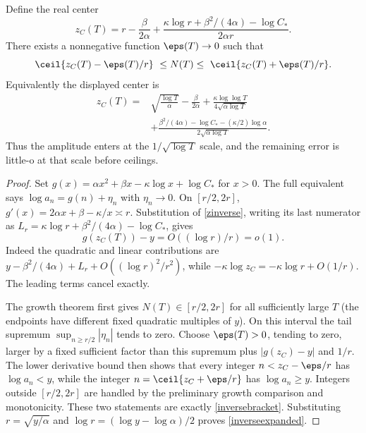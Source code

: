 \begin{corollary}\label{cor:inverse}
Define the real center
\begin{equation}\label{zinverse}
 z_C(T)=r-\frac{\beta}{2\alpha}
       +\frac{\kappa\log r+\beta^2/(4\alpha)-\log C_*}{2\alpha r}.
\end{equation}
There exists a nonnegative function $\eps(T)\to0$ such that
\begin{equation}\label{inversebracket}
 \ceil{z_C(T)-\eps(T)/r}\ \le N(T)\le\ \ceil{z_C(T)+\eps(T)/r}.
\end{equation}
Equivalently the displayed center is
\begin{align}\label{inverseexpanded}
 z_C(T)={}&\sqrt{\frac{\log T}{\alpha}}-\frac{\beta}{2\alpha}
 +\frac{\kappa\log\log T}{4\sqrt{\alpha\log T}}\nonumber\\
 &+\frac{\beta^2/(4\alpha)-\log C_*-(\kappa/2)\log\alpha}
             {2\sqrt{\alpha\log T}}.
\end{align}
Thus the amplitude enters at the $1/\sqrt{\log T}$ scale, and the
remaining error is little-o at that scale before ceilings.
\end{corollary}
\begin{proof}
Set $g(x)=\alpha x^2+\beta x-\kappa\log x+\log C_*$ for $x>0$.
The full equivalent says $\log a_n=g(n)+\eta_n$ with $\eta_n\to0$.
On $[r/2,2r]$, $g'(x)=2\alpha x+\beta-\kappa/x\asymp r$.
Substitution of \eqref{zinverse}, writing its last numerator as
$L_r=\kappa\log r+\beta^2/(4\alpha)-\log C_*$, gives
\[
 g(z_C(T))-y=O((\log r)/r)=o(1).
\]
Indeed the quadratic and linear contributions are
$y-\beta^2/(4\alpha)+L_r+O((\log r)^2/r^2)$,
while $-\kappa\log z_C=-\kappa\log r+O(1/r)$.
The leading terms cancel exactly.

The growth theorem first gives $N(T)\in[r/2,2r]$ for all sufficiently
large $T$ (the endpoints have different fixed quadratic multiples
of $y$). On this interval the tail supremum
$\sup_{n\ge r/2}|\eta_n|$ tends to zero.
Choose $\eps(T)>0$, tending to zero, larger by a fixed sufficient
factor than this supremum plus $|g(z_C)-y|$ and $1/r$.
The lower derivative bound then shows that every integer
$n<z_C-\eps/r$ has $\log a_n<y$, while the integer
$n=\ceil{z_C+\eps/r}$ has $\log a_n\ge y$.
Integers outside $[r/2,2r]$ are handled by the preliminary growth
comparison and monotonicity. These two statements are exactly
\eqref{inversebracket}. Substituting $r=\sqrt{y/\alpha}$ and
$\log r=(\log y-\log\alpha)/2$ proves \eqref{inverseexpanded}.
\end{proof}

